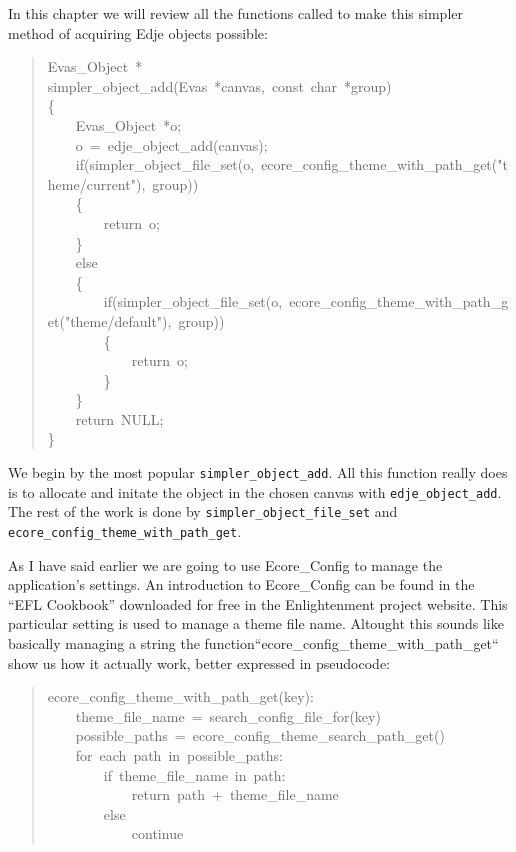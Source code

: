\documentclass[12pt,a4paper,english]{book}
\begin{document}
In this chapter we will review all the functions called to make this simpler
method of acquiring Edje objects possible:
\begin{quote}{\ttfamily \raggedright \noindent
Evas{\_}Object~*~\\
simpler{\_}object{\_}add(Evas~*canvas,~const~char~*group)~\\
{\{}~\\
~~~~Evas{\_}Object~*o;~\\
~~~~o~=~edje{\_}object{\_}add(canvas);~\\
~~~~if(simpler{\_}object{\_}file{\_}set(o,~ecore{\_}config{\_}theme{\_}with{\_}path{\_}get("theme/current"),~group))~\\
~~~~{\{}~\\
~~~~~~~~return~o;~\\
~~~~{\}}~\\
~~~~else~\\
~~~~{\{}~\\
~~~~~~~~if(simpler{\_}object{\_}file{\_}set(o,~ecore{\_}config{\_}theme{\_}with{\_}path{\_}get("theme/default"),~group))~\\
~~~~~~~~{\{}~\\
~~~~~~~~~~~~return~o;~\\
~~~~~~~~{\}}~\\
~~~~{\}}~\\
~~~~return~NULL;~\\
{\}}
}\end{quote}

We begin by the most popular \texttt{simpler{\_}object{\_}add}. All this function really
does is to allocate and initate the object in the chosen canvas with
\texttt{edje{\_}object{\_}add}. The rest of the work is done by \texttt{simpler{\_}object{\_}file{\_}set}
and \texttt{ecore{\_}config{\_}theme{\_}with{\_}path{\_}get}.

As I have said earlier we are going to use Ecore{\_}Config to manage the
application's settings. An introduction to Ecore{\_}Config can be found in the
``EFL Cookbook'' downloaded for free in the Enlightenment project website. This
particular setting is used to manage a theme file name. Altought this sounds
like basically managing a string the function``ecore{\_}config{\_}theme{\_}with{\_}path{\_}get``
show us how it actually work, better expressed in pseudocode:
\begin{quote}{\ttfamily \raggedright \noindent
ecore{\_}config{\_}theme{\_}with{\_}path{\_}get(key):~\\
~~~~theme{\_}file{\_}name~=~search{\_}config{\_}file{\_}for(key)~\\
~~~~possible{\_}paths~=~ecore{\_}config{\_}theme{\_}search{\_}path{\_}get()~\\
~~~~for~each~path~in~possible{\_}paths:~\\
~~~~~~~~if~theme{\_}file{\_}name~in~path:~\\
~~~~~~~~~~~~return~path~+~theme{\_}file{\_}name~\\
~~~~~~~~else~\\
~~~~~~~~~~~~continue
}\end{quote}
\end{document}
